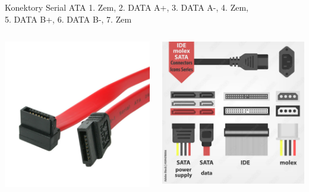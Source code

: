 \documentclass[aspectratio=43]{beamer}
\begin{document}
\begin{frame}{Konektory Serial ATA}
	1. Zem, 2. DATA A+, 3. DATA A-, 4. Zem, \\5. DATA B+, 6. DATA B-, 7. Zem
	
	\begin{columns}
		\begin{center}
			\includegraphics[width=0.8\linewidth]{extrahovane_obrazky/sata_c.jpeg}
		\end{center}
		\begin{center}
			\includegraphics[width=1\linewidth]{extrahovane_obrazky/sata_comp.jpeg}
		\end{center}
	\end{columns}
\end{frame}
\end{document}
